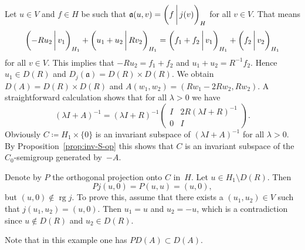 \documentclass[a4paper,oneside,12pt]{amsart}
\theoremstyle{plain}
\theoremstyle{definition}
\newenvironment{example}
{\pushQED{\qed}

\examplex}
{\popQED\endexamplex}
\begin{document}
\begin{example}
Let $u\in V$ and $f\in H$ be such that ${{\mathfrak{{a}}}}(u,v)={{\ifthenelse{\equal{auto}{auto}}{\left({f}\mkern3mu{\biggm|}\mkern3mu {j(v)}\right)}{}
\ifthenelse{\equal{auto}{b}}{\bigl({f}\mkern3mu{\biggm|}\mkern3mu {j(v)}\bigr)}{}
\ifthenelse{\equal{auto}{B}}{\Bigl({f}\mkern3mu{\bigm|}\mkern3mu {j(v)}\Bigr)}{}
}}_H$ for all $v\in V$. That means
\[
    {{\ifthenelse{\equal{auto}{auto}}{\left({-Ru_2}\mkern3mu{\biggm|}\mkern3mu {v_1}\right)}{}
\ifthenelse{\equal{auto}{b}}{\bigl({-Ru_2}\mkern3mu{\biggm|}\mkern3mu {v_1}\bigr)}{}
\ifthenelse{\equal{auto}{B}}{\Bigl({-Ru_2}\mkern3mu{\bigm|}\mkern3mu {v_1}\Bigr)}{}
}}_{H_1} + {{\ifthenelse{\equal{auto}{auto}}{\left({u_1+u_2}\mkern3mu{\biggm|}\mkern3mu {Rv_2}\right)}{}
\ifthenelse{\equal{auto}{b}}{\bigl({u_1+u_2}\mkern3mu{\biggm|}\mkern3mu {Rv_2}\bigr)}{}
\ifthenelse{\equal{auto}{B}}{\Bigl({u_1+u_2}\mkern3mu{\bigm|}\mkern3mu {Rv_2}\Bigr)}{}
}}_{H_1} = {{\ifthenelse{\equal{auto}{auto}}{\left({f_1+f_2}\mkern3mu{\biggm|}\mkern3mu {v_1}\right)}{}
\ifthenelse{\equal{auto}{b}}{\bigl({f_1+f_2}\mkern3mu{\biggm|}\mkern3mu {v_1}\bigr)}{}
\ifthenelse{\equal{auto}{B}}{\Bigl({f_1+f_2}\mkern3mu{\bigm|}\mkern3mu {v_1}\Bigr)}{}
}}_{H_1} + {{\ifthenelse{\equal{auto}{auto}}{\left({f_2}\mkern3mu{\biggm|}\mkern3mu {v_2}\right)}{}
\ifthenelse{\equal{auto}{b}}{\bigl({f_2}\mkern3mu{\biggm|}\mkern3mu {v_2}\bigr)}{}
\ifthenelse{\equal{auto}{B}}{\Bigl({f_2}\mkern3mu{\bigm|}\mkern3mu {v_2}\Bigr)}{}
}}_{H_1}
\]
for all $v\in V$. This implies that $-Ru_2=f_1+f_2$ and $u_1+u_2=R^{-1}f_2$. Hence $u_1\in D(R)$ and $D_j({{\mathfrak{{a}}}})=D(R)\times D(R)$.
We obtain $D(A)=D(R)\times D(R)$ and $A(w_1,w_2)=(Rw_1-2Rw_2, Rw_2)$.
A straightforward calculation shows that for all $\lambda>0$ we have
\[
    (\lambda I +A)^{-1} = (\lambda I+R)^{-1}\begin{pmatrix} I & 2R(\lambda I+R)^{-1} \\ 0 & I\end{pmatrix}.
\]
Obviously $C\coloneqq H_1\times\{0\}$ is an invariant subspace of $(\lambda I + A)^{-1}$ for all $\lambda>0$.
By Proposition~\ref{prop:inv-S-op} this shows that $C$ is an invariant subspace of the $C_0$-semigroup generated by~$-A$.

Denote by $P$ the orthogonal projection onto $C$ in~$H$. Let $u\in H_1\setminus D(R)$. Then 
\[
    Pj(u,0)=P(u,u) = (u,0),
\]
but $(u,0)\notin\operatorname{rg} j$. To prove this, assume that there exists a $(u_1,u_2)\in V$ such that $j(u_1,u_2)=(u,0)$. Then $u_1=u$ and $u_2=-u$,
which is a contradiction since $u\notin D(R)$ and $u_2\in D(R)$.

Note that in this example one has $PD(A)\subset D(A)$.
\end{example}
\end{document}
